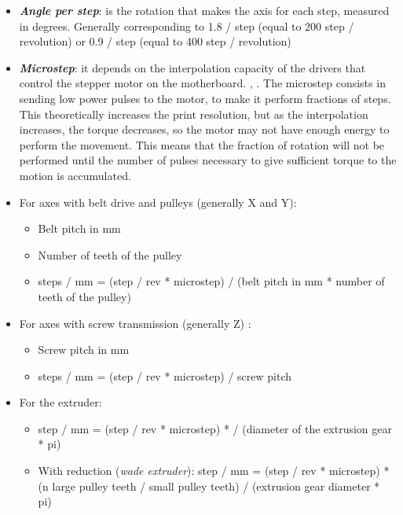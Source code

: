 \begin{itemize}
\item \emph{\textbf{Angle per step}}: is the rotation that makes the axis for each step, measured in degrees. Generally corresponding to 1.8 / step (equal to 200 step / revolution) or 0.9 / step (equal to 400 step / revolution)
\item \emph{\textbf{Microstep}}: it depends on the interpolation capacity of the drivers that control the stepper motor on the motherboard. \parencite{Reference5}, \parencite{Reference6}. The microstep consists in sending low power pulses to the motor, to make it perform fractions of steps. This theoretically increases the print resolution, but as the interpolation increases, the torque decreases, so the motor may not have enough energy to perform the movement. This means that the fraction of rotation will not be performed until the number of pulses necessary to give sufficient torque to the motion is accumulated.
\item For axes with belt drive and pulleys (generally X and Y):

\begin{itemize}
\item Belt pitch in mm
\item Number of teeth of the pulley
\item steps / mm = (step / rev * microstep) / (belt pitch in mm * number of teeth of the pulley)
\end{itemize}

\item For axes with screw transmission (generally Z) \parencite{Reference51}:

\begin{itemize}
\item Screw pitch in mm
\item steps / mm = (step / rev * microstep) / screw pitch
\end{itemize}

\item For the extruder:

\begin {itemize}
\item step / mm = (step / rev * microstep) * / (diameter of the extrusion gear * pi)
\item With reduction (\emph{wade extruder}): step / mm = (step / rev * microstep) * (n large pulley teeth / small pulley teeth) / (extrusion gear diameter * pi)
\end{itemize}

\end{itemize}
	

